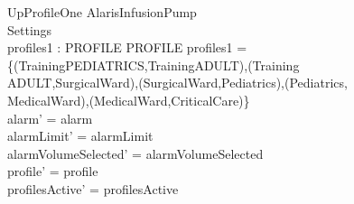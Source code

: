 \begin{schema}{UpProfileOne}
	\Delta AlarisInfusionPump\\
	 Settings\\
	profiles1 : PROFILE \rel PROFILE
	\where
	profiles1 = \{(TrainingPEDIATRICS,TrainingADULT),(Training\\
	ADULT,SurgicalWard),(SurgicalWard,Pediatrics),(Pediatrics,\\
	MedicalWard),(MedicalWard,CriticalCare)\}\\
	alarm' = alarm\\
	alarmLimit' = alarmLimit\\
	alarmVolumeSelected' = alarmVolumeSelected\\
	profile' = profile\\
	profilesActive' = profilesActive\\
	

\end{schema}
